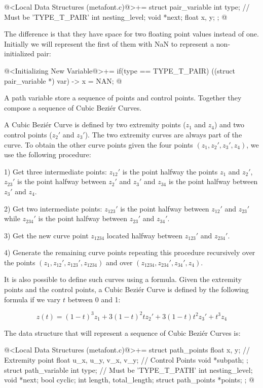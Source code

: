 \iniciocodigo
@<Local Data Structures (metafont.c)@>+=
struct pair_variable{
  int type; // Must be 'TYPE_T_PAIR'
  int nesting_level;
  void *next;
  float x, y;
};
@
\fimcodigo

The difference is that they have space for two floating point values
instead of one. Initially we will represent the first of them with NaN
to represent a non-initialized pair:

\iniciocodigo
@<Initializing New Variable@>+=
if(type == TYPE_T_PAIR){
  ((struct pair_variable *) var) -> x = NAN;
}
@
\fimcodigo


A path variable store a sequence of points and control
points. Together they compose a sequence of Cubic Beziér Curves.

A Cubic Beziér Curve is defined by two extremity points ($z_1$ and
$z_4$) and two control points ($z_2'$ and $z_3'$). The two extremity
curves are always part of the curve. To obtain the other curve points
given the four points $(z_1, z_2', z_3', z_4)$, we use the following
procedure:

1) Get three intermediate points: $z_{12}'$ is the point halfway the
points $z_1$ and $z_2'$, $z_{23}'$ is the point halfway between $z_2'$
and $z_3'$ and $z_{34}$ is the point halfway between $z_3'$ and $z_4$.

2) Get two intermediate points: $z_{123}'$ is the point halfway
between $z_{12}'$ and $z_{23}'$ while $z_{234}'$ is the point halfway
between $z_{23}'$ and $z_{34}'$.

3) Get the new curve point $z_{1234}$ located halfway between
$z_{123}'$ and $z_{234}'$.

4) Generate the remaining curve points repeating this procedure
recursively over the points $(z_1, z_{12}', z_{123}', z_{1234})$ and
over $(z_{1234}, z_{234}', z_{34}', z_4)$.

It is also possible to define such curves using a formula. Given the
extremity points and the control points, a Cubic Beziér Curve is
defined by the following formula if we vary $t$ between 0 and 1:

$$
z(t) = (1-t)^3z_1 + 3(1-t)^2tz_2' + 3(1-t)t^2z_3'+t^3z_4
$$

The data structure that will represent a sequence of Cubic Beziér
Curves is:

\iniciocodigo
@<Local Data Structures (metafont.c)@>+=
struct path_points{
  float x, y; // Extremity point
  float u_x, u_y, v_x, v_y;   // Control Points
  void *subpath;
};
struct path_variable{
  int type; // Must be 'TYPE_T_PATH'
  int nesting_level;
  void *next;
  bool cyclic;
  int length, total_length;
  struct path_points *points;
};
@
\fimcodigo

